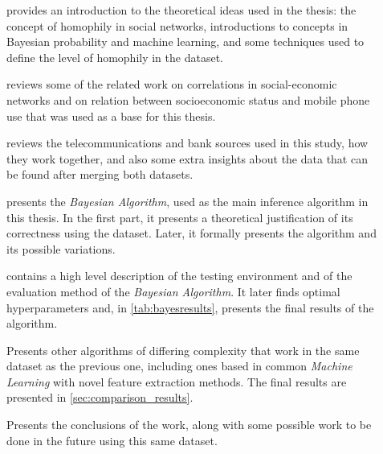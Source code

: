 \begin{description}
\item[] provides an introduction to the theoretical ideas used in the thesis: the concept of homophily in social networks, introductions to concepts in Bayesian probability and machine learning, and some techniques used to define the level of homophily in the dataset.
\item[] reviews some of the related work on correlations in social-economic networks and on relation between socioeconomic status and mobile phone use that was used as a base for this thesis.
\item[] reviews the telecommunications and bank sources used in this study, how they work together, and also some extra insights about the data that can be found after merging both datasets.
\item[] presents the \emph{Bayesian Algorithm}, used as the main inference algorithm in this thesis. In the first part, it presents a theoretical justification of its correctness using the dataset. Later, it formally presents the algorithm and its possible variations.
\item[] contains a high level description of the testing environment and of the evaluation method of the \emph{Bayesian Algorithm}. It later finds optimal hyperparameters and, in \cref{tab:bayesresults}, presents the final results of the algorithm.
\item[] Presents other algorithms of differing complexity that work in the same dataset as the previous one, including ones based in common \emph{Machine Learning} with novel feature extraction methods. The final results are presented in \cref{sec:comparison_results}.
\item[] Presents the conclusions of the work, along with some possible work to be done in the future using this same dataset.
\end{description}
